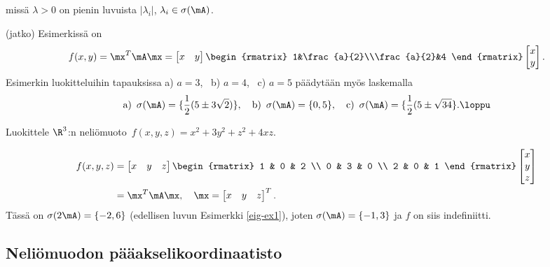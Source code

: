 missä $\lambda>0$ on pienin luvuista $|\lambda_i|$, $\lambda_i\in\sigma(\mA)$.
\jatko \begin{Exa} (jatko) Esimerkissä on
\[
f(x,y) = \mx^T\mA\mx = \begin{bmatrix} x&y \end{bmatrix}
                       \begin{rmatrix} 1&\frac{a}{2}\\\frac{a}{2}&4 \end{rmatrix}
                       \begin{bmatrix} x\\y \end{bmatrix}.
\]
Esimerkin luokitteluihin tapauksissa a) $a=3$, \ b) $a=4$, \ c) $a=5$ päädytään myös
laskemalla
\[
\text{a)}\,\ \sigma(\mA)=\{\frac{1}{2}(5 \pm 3\sqrt{2})\}, \quad
\text{b)}\,\ \sigma(\mA)=\{0,5\}, \quad
\text{c)}\,\ \sigma(\mA)=\{\frac{1}{2}(5 \pm \sqrt{34}\}. \loppu
\]
\end{Exa} 
\begin{Exa} Luokittele $\R^3$:n neliömuoto $\,f(x,y,z)=x^2+3y^2+z^2+4xz$.
\end{Exa}
\ratk
\begin{align*}
f(x,y,z) &= \begin{bmatrix} x & y & z \end{bmatrix} \begin{rmatrix}
1 & 0 & 2 \\ 0 & 3 & 0 \\ 2 & 0 & 1 \end{rmatrix}\begin{bmatrix} x \\ y \\ z \end{bmatrix} \\
&= \mx^T\mA\mx,\quad \mx=\begin{bmatrix} x & y & z \end{bmatrix}^T.
\end{align*}
Tässä on $\sigma(2\mA)=\{-2,6\}$ (edellisen luvun Esimerkki \ref{eig-ex1}), joten
$\sigma(\mA)=\{-1,3\}$ ja $f$ on siis indefiniitti. \loppu

\subsection{Neliömuodon pääakselikoordinaatisto}

